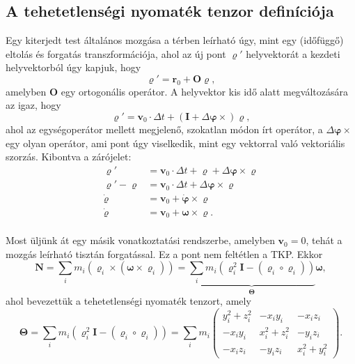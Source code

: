 \documentclass[12pt,a4paper]{scrartcl}
\let\mathbf\bm
\begin{document}
\subsection{A tehetetlenségi nyomaték tenzor definíciója}
Egy kiterjedt test általános mozgása a térben leírható úgy, mint egy (időfüggő) eltolás és forgatás transzformációja, ahol az új pont ${\mathbf{\varrho }}'$ helyvektorát a kezdeti helyvektorból úgy kapjuk, hogy
\[{\mathbf{\varrho }}' = {{\mathbf{r}}_0} + {\mathbf{O\varrho }},\]
amelyben ${\mathbf{O}}$ egy ortogonális operátor. A helyvektor kis idő alatt megváltozására az igaz, hogy
\[{\mathbf{\varrho }}' = {{\mathbf{v}}_0} \cdot \Delta t + \left( {{\mathbf{I}} + \Delta {\mathbf{\varphi }} \times } \right){\mathbf{\varrho }},\]
ahol az egységoperátor mellett megjelenő, szokatlan módon írt operátor, a ${\Delta {\mathbf{\varphi }} \times }$ egy olyan operátor, ami pont úgy viselkedik, mint egy vektorral való vektoriális szorzás. Kibontva a zárójelet:
\[\begin{aligned}
  {\mathbf{\varrho }}' &  = {{\mathbf{v}}_0} \cdot \Delta t + {\mathbf{\varrho }} + \Delta {\mathbf{\varphi }} \times {\mathbf{\varrho }} \\ 
  {\mathbf{\varrho }}' - {\mathbf{\varrho }} &  = {{\mathbf{v}}_0} \cdot \Delta t + \Delta {\mathbf{\varphi }} \times {\mathbf{\varrho }} \\ 
  {\mathbf{\dot \varrho }} &  = {{\mathbf{v}}_0} + {\mathbf{\dot \varphi }} \times {\mathbf{\varrho }} \\ 
  {\mathbf{\dot \varrho }} &  = {{\mathbf{v}}_0} + {\mathbf{\omega }} \times {\mathbf{\varrho }}. \\ 
\end{aligned} \]

Most üljünk át egy másik vonatkoztatási rendszerbe, amelyben ${{\mathbf{v}}_0} = 0$, tehát a mozgás leírható tisztán forgatással. Ez a pont nem feltétlen a TKP. Ekkor
\[{\mathbf{N}} = \sum\limits_i {{m_i}\left( {{{\mathbf{\varrho }}_i} \times \left( {{\mathbf{\omega }} \times {{\mathbf{\varrho }}_i}} \right)} \right)}  = \underbrace {\sum\limits_i {{m_i}\left( {{\mathbf{\varrho }}_i^2{\mathbf{I}} - \left( {{{\mathbf{\varrho }}_i} \circ {{\mathbf{\varrho }}_i}} \right)} \right)} }_{\mathbf{\Theta }}{\mathbf{\omega }},\]
ahol bevezettük a tehetetlenségi nyomaték tenzort, amely
\[{\mathbf{\Theta }} = \sum\limits_i {{m_i}\left( {{\mathbf{\varrho }}_i^2{\mathbf{I}} - \left( {{{\mathbf{\varrho }}_i} \circ {{\mathbf{\varrho }}_i}} \right)} \right)}  = \sum\limits_i {{m_i}\left( {\begin{array}{*{20}{c}}
  {y_i^2 + z_i^2}&{ - {x_i}{y_i}}&{ - {x_i}{z_i}} \\ 
  { - {x_i}{y_i}}&{x_i^2 + z_i^2}&{ - {y_i}{z_i}} \\ 
  { - {x_i}{z_i}}&{ - {y_i}{z_i}}&{x_i^2 + y_i^2} 
\end{array}} \right)}. \]
\end{document}
